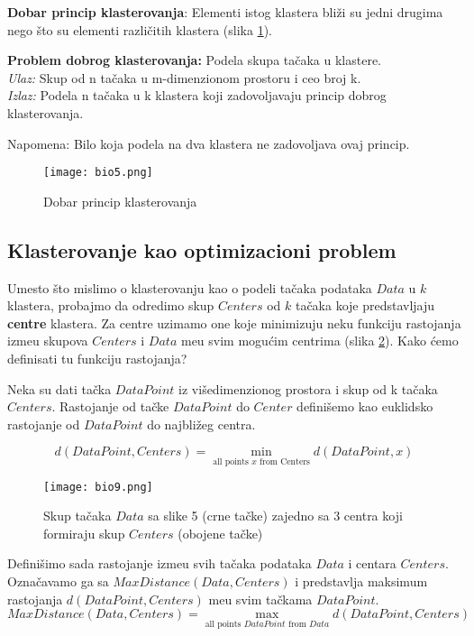 \textbf{Dobar princip klasterovanja}: Elementi istog klastera bliži su jedni drugima nego što su elementi različitih klastera (slika \ref{slika 5}).

\begin{tcolorbox}
\textbf{Problem dobrog klasterovanja:} Podela skupa tačaka u klastere.\\
\textit{Ulaz:} Skup od n tačaka u m-dimenzionom prostoru i ceo broj k.\\
\textit{Izlaz:} Podela n tačaka u k klastera koji zadovoljavaju princip dobrog klasterovanja.
\end{tcolorbox}

\noindent Napomena: Bilo koja podela na dva klastera ne zadovoljava ovaj princip.
\begin{figure}[h]
    \centering
    \texttt{[image: bio5.png]}
    \caption{Dobar princip klasterovanja}
    \label{slika 5}
\end{figure}

\subsection{Klasterovanje kao optimizacioni problem}

Umesto što mislimo o klasterovanju kao o podeli tačaka podataka $Data$ u $k$ klastera, probajmo da odredimo skup $Centers$ od $k$ tačaka koje predstavljaju \textbf{centre} klastera. Za centre uzimamo one koje minimizuju neku funkciju rastojanja izme\dj u skupova $Centers$ i $Data$ me\dj u svim mogućim centrima (slika \ref{slika 6}). Kako ćemo definisati tu funkciju rastojanja?

Neka su dati tačka $DataPoint$ iz višedimenzionog prostora i skup od k tačaka $Centers$. Rastojanje od tačke $DataPoint$ do $Center$ definišemo kao euklidsko rastojanje od $DataPoint$ do najbližeg centra.

$$d(DataPoint, Centers) = \min_{\text{all points }x\text{ from Centers}} d(DataPoint, x)$$ 
\begin{figure}[h]
    \centering
    \texttt{[image: bio9.png]}
    \caption{Skup tačaka $Data$ sa slike 5 (crne tačke) zajedno sa 3 centra koji formiraju skup $Centers$ (obojene tačke)}
    \label{slika 6}
\end{figure}

Definišimo sada rastojanje izme\dj u svih tačaka podataka $Data$ i centara $Centers$. Označavamo ga sa $MaxDistance(Data, Centers)$ i predstavlja maksimum rastojanja $d(DataPoint, Centers)$ me\dj u svim tačkama $DataPoint$.
$$MaxDistance(Data, Centers) = \max_{\text{all points }DataPoint\text{ from }Data} d(DataPoint, Centers)$$

